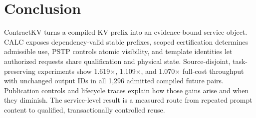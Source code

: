 \section{Conclusion}
\label{sec:conclusion}
ContractKV turns a compiled KV prefix into an evidence-bound service object. CALC exposes dependency-valid stable prefixes, scoped certification determines admissible use, PSTP controls atomic visibility, and template identities let authorized requests share qualification and physical state. Source-disjoint, task-preserving experiments show 1.619$\times$, 1.109$\times$, and 1.070$\times$ full-cost throughput with unchanged output IDs in all 1,296 admitted compiled future pairs. Publication controls and lifecycle traces explain how those gains arise and when they diminish. The service-level result is a measured route from repeated prompt content to qualified, transactionally controlled reuse.
